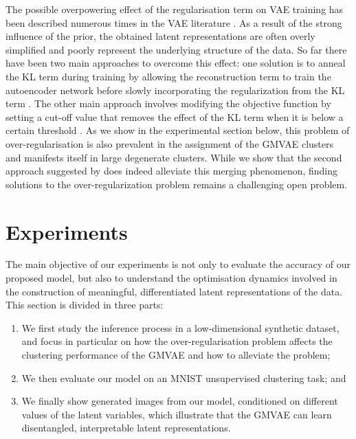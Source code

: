 \documentclass{article} \usepackage{iclr2017_conference,times}
\begin{document}
The possible overpowering effect of the regularisation term on VAE training has been described numerous times in the VAE literature \citep{bowman2015generating,sonderby2016train,kingma2016improving,chen2016variational}. As a result of the strong influence of the prior, the obtained latent representations are often overly simplified and poorly represent the underlying structure of the data.
So far there have been two main approaches to overcome this effect: one solution is to anneal the KL term during training by allowing the reconstruction term to train the autoencoder network before slowly incorporating the regularization from the KL term \citep{sonderby2016train}. The other main approach involves modifying the objective function by setting a cut-off value that removes the effect of the KL term when it is below a certain threshold \citep{kingma2016improving}.
As we show in the experimental section below, this problem of over-regularisation is also prevalent in the assignment of the GMVAE clusters and manifests itself in large degenerate clusters. While we show that the second approach suggested by \cite{kingma2016improving} does indeed alleviate this merging phenomenon, finding solutions to the over-regularization problem remains a challenging open problem.




\section{Experiments}

The main objective of our experiments is not only to evaluate the accuracy of our proposed model, but also to understand the optimisation dynamics involved in the construction of meaningful, differentiated latent representations of the data. This section is divided in three parts:

\begin{enumerate}
\item We first study the inference process in a low-dimensional synthetic dataset, and focus in particular on how the over-regularisation problem affects the clustering performance of the GMVAE and how to alleviate the problem;

\item We then evaluate our model on an MNIST unsupervised clustering task; and

\item We finally show generated images from our model, conditioned on different values of the latent variables, which illustrate that the GMVAE can learn disentangled, interpretable latent representations.
\end{enumerate}
\end{document}

